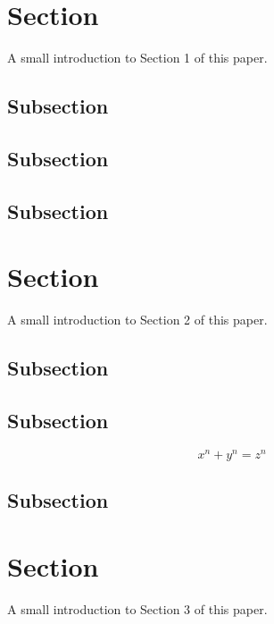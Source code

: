 \documentclass{article}[12]
\newcommand{\thisWillProbablyChange}{A small introduction to Section }
\begin{document}
\begin{center}
	\vspace*{\fill}
	\tableofcontents
	\vspace*{\fill}
\end{center}
\newpage
\section{Section}
	\thisWillProbablyChange 1 of this paper. \cite{First Fake Source}
	\subsection{Subsection}
	\lipsum[1-1]
	\subsection{Subsection}
	\lipsum[2-3]
	\subsection{Subsection}
	\lipsum[3-3]
\section{Section}
	\thisWillProbablyChange 2 of this paper. \cite{Second Fake Source}
	\subsection{Subsection}
	\lipsum[4-6]
	\subsection{Subsection}
	\lipsum[1-1]
	\[ x^n + y^n = z^n \]
	\subsection{Subsection}
	\lipsum[6-6]
\section{Section}
	\thisWillProbablyChange 3 of this paper. \cite{Third Fake Source}
\end{document}
